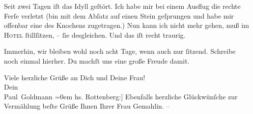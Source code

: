 \pstart
           Seit zwei Tagen iſt das Idyll geſtört. Ich habe mir bei einem Ausflug die \introOben{}rechte\introOben{} Ferſe verletzt (bin mit dem Abſatz auf einen Stein
               geſprungen und habe mir offenbar eine \label{K_L03385-5v}\label{K_L03385-5} des Knochens zugetragen.) Nun kann ich nicht mehr {\pb}gehen, muß im \textsc{Hotel}{ }ſtillſitzen, –{ }ſie desgleichen. Und das iſt
               recht traurig.\pend
           
\pstart
           Immerhin, wir bleiben wohl noch acht Tage, wenn auch nur{ }ſitzend. Schreibe noch
               einmal hierher. Du machſt uns eine große Freude damit.\pend
           
\pstart
           Viele herzliche Grüße an Dich und Deine Frau! {\\[\baselineskip]}Dein {\\[\baselineskip]}\spacefill\mbox{Paul Goldmann}\pend
           \leftskip=0em{}
\pstart
           \noindent{}{[}hs. Rottenberg:{]} Ebenfalls herzliche Glückwünſche zur Vermählung {\kaufmannsund} beſte Grüße Ihnen {\kaufmannsund}
                  Ihrer Frau Gemahlin. –\pend
           \endnumbering{}  \newcommand{\dateiname}{L03385}\newcommand{\titel}{Paul Goldmann und Theodore Rottenberg an Arthur Schnitzler, 29. 8. 1903}\newcommand{\editorInnen}{Martin Anton Müller und Laura Untner}

